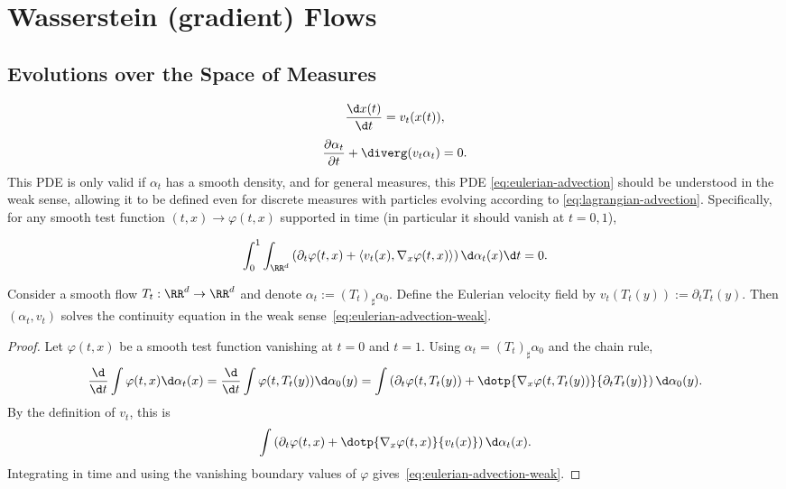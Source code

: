 \section{Wasserstein (gradient) Flows}
\label{sec-wasserstein-flows}
\subsection{Evolutions over the Space of Measures}
\begin{equation}
\frac{\d x(t)}{\d t} = v_t(x(t)), \label{eq:lagrangian-advection}
\end{equation}
\begin{equation}
\frac{\partial \alpha_t}{\partial t} + \diverg(v_t \alpha_t) = 0. \label{eq:eulerian-advection}
\end{equation}
This PDE is only valid if $\alpha_t$ has a smooth density, and for general measures, this PDE \eqref{eq:eulerian-advection} should be understood in the weak sense, allowing it to be defined even for discrete measures with particles evolving according to \eqref{eq:lagrangian-advection}. Specifically, for any smooth test function $(t,x) \to \varphi(t,x)$ supported in time (in particular it should vanish at $t=0,1$),

\begin{equation}\label{eq:eulerian-advection-weak}
\int_0^1 \int_{\RR^d}
\left( \partial_t \varphi(t,x) + \langle v_t(x), \nabla_x \varphi(t,x) \rangle \right)
\d \alpha_t(x) \d t = 0.
\end{equation}
\begin{prop}
Consider a smooth flow $T_t: \RR^d \to \RR^d$ and denote $\alpha_t:= (T_t)_\sharp \alpha_0$. Define the Eulerian velocity field by \(v_t(T_t(y)):= \partial_t T_t(y).\)
Then $(\alpha_t, v_t)$ solves the continuity equation in the weak sense~\eqref{eq:eulerian-advection-weak}.
\end{prop}
\begin{proof}
Let $\varphi(t,x)$ be a smooth test function vanishing at $t=0$ and $t=1$. Using $\alpha_t=(T_t)_\sharp\alpha_0$ and the chain rule,
\[
\frac{\d}{\d t}\int \varphi(t,x)\d\alpha_t(x)
=
\frac{\d}{\d t}\int \varphi(t,T_t(y))\d\alpha_0(y)
=
\int \left(\partial_t \varphi(t,T_t(y))+
\dotp{\nabla_x\varphi(t,T_t(y))}{\partial_t T_t(y)}\right)\d\alpha_0(y).
\]
By the definition of $v_t$, this is
\[
\int \left(\partial_t \varphi(t,x)+
\dotp{\nabla_x\varphi(t,x)}{v_t(x)}\right)\d\alpha_t(x).
\]
Integrating in time and using the vanishing boundary values of $\varphi$ gives~\eqref{eq:eulerian-advection-weak}.
\end{proof}
